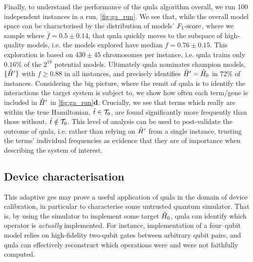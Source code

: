 Finally, to understand the performance of the \gls{qmla} algorithm overall, 
    we run 100 independent \glspl{instance} in a \gls{run}, \cref{fig:ga_run}. 
We see that, while the overall model space can be characterised by the distribution 
    of models' $ F_{1}\text{-score} $, where we sample where $\bar{f} = 0.5 \pm 0.14$, 
    that \gls{qmla} quickly moves to the subspace of high-quality models, 
    i.e. the models explored have median $f = 0.76 \pm 0.15$.
This exploration is based on $430 \pm 45$ chromosomes per instance, 
    i.e. \gls{qmla} trains only $0.16\%$ of the $2^{18}$ potential models. 
Ultimately \gls{qmla} nominates champion models, $\{ \hat{H}^{\prime} \}$ with $f \geq 0.88$ in all instances, 
    and precisely identifies $\hat{H}^{\prime}=\hat{H}_0$ in $72\%$ of instances. 
Considering the big picture, where the remit of \gls{qmla} is to identify the interactions 
    the target system is subject to, we show how often each term/gene is included in $\hat{H}^{\prime}$ in 
    \cref{fig:ga_run}\textbf{d}. 
Crucially, we see that terms which really are within the true Hamiltonian, $\hat{t} \in \mathcal{T}_0$, 
    are found significantly more frequently than those without, $\hat{t} \notin \mathcal{T}_0$. 
This level of analysis can be used to post-validate the outcome of \gls{qmla}, 
    i.e. rather than relying on $\hat{H}^{\prime}$ from a single instance, 
    trusting the terms' individual frequencies as evidence that they are of importance when describing 
    the system of interest. 

\subsection{Device characterisation}
This adaptive \gls{ges} may prove a useful application of \gls{qmla} in the domain of device calibration,
    in particular to characterise some untrusted quantum simulator.
That is, by using the simulator to implement some target $\hat{H}_0$, 
    \gls{qmla} can identify which operator is \emph{actually} implemented.
For instance, implementation of a four--qubit model
    relies on high-fidelity two-qubit gates between arbitrary qubit pairs, 
    and \gls{qmla} can effectively reconstruct which operations were and were not faithfully computed.
